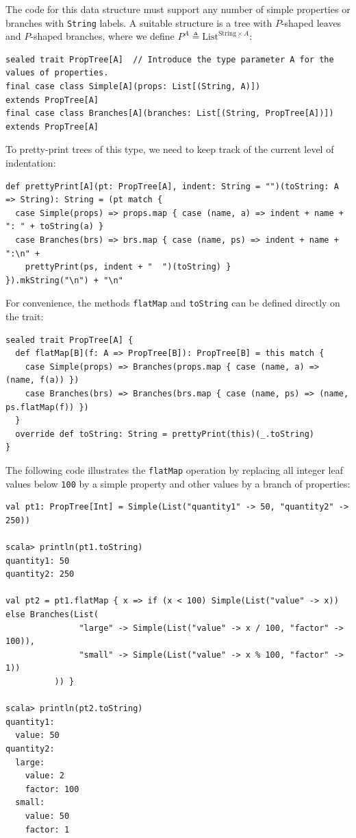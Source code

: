 The code for this data structure must support any number of simple
properties or branches with \lstinline!String! labels. A suitable
structure is a tree with $P$-shaped leaves and $P$-shaped branches,
where we define $P^{A}\triangleq\text{List}^{\text{String}\times A}$:
\begin{lstlisting}
sealed trait PropTree[A]  // Introduce the type parameter A for the values of properties.
final case class Simple[A](props: List[(String, A)])                  extends PropTree[A]
final case class Branches[A](branches: List[(String, PropTree[A])])   extends PropTree[A]
\end{lstlisting}
To pretty-print trees of this type, we need to keep track of the current
level of indentation:
\begin{lstlisting}
def prettyPrint[A](pt: PropTree[A], indent: String = "")(toString: A => String): String = (pt match {
  case Simple(props) => props.map { case (name, a) => indent + name + ": " + toString(a) }
  case Branches(brs) => brs.map { case (name, ps) => indent + name + ":\n" +
    prettyPrint(ps, indent + "  ")(toString) }
}).mkString("\n") + "\n"
\end{lstlisting}
For convenience, the methods \lstinline!flatMap! and \lstinline!toString!
can be defined directly on the trait:
\begin{lstlisting}
sealed trait PropTree[A] {
  def flatMap[B](f: A => PropTree[B]): PropTree[B] = this match {
    case Simple(props) => Branches(props.map { case (name, a) => (name, f(a)) })
    case Branches(brs) => Branches(brs.map { case (name, ps) => (name, ps.flatMap(f)) })
  }
  override def toString: String = prettyPrint(this)(_.toString)
}
\end{lstlisting}

The following code illustrates the \lstinline!flatMap! operation
by replacing all integer leaf values below \lstinline!100! by a simple
property and other values by a branch of properties:
\begin{lstlisting}
val pt1: PropTree[Int] = Simple(List("quantity1" -> 50, "quantity2" -> 250))

scala> println(pt1.toString)
quantity1: 50
quantity2: 250

val pt2 = pt1.flatMap { x => if (x < 100) Simple(List("value" -> x)) else Branches(List(
               "large" -> Simple(List("value" -> x / 100, "factor" -> 100)),
               "small" -> Simple(List("value" -> x % 100, "factor" -> 1))
          )) }

scala> println(pt2.toString)
quantity1:
  value: 50
quantity2:
  large:
    value: 2
    factor: 100
  small:
    value: 50
    factor: 1
\end{lstlisting}


